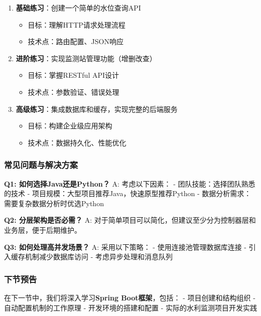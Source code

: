 \begin{enumerate}
\def\labelenumi{\arabic{enumi}.}
\tightlist
\item
  \textbf{基础练习}：创建一个简单的水位查询API

  \begin{itemize}
  \tightlist
  \item
    目标：理解HTTP请求处理流程
  \item
    技术点：路由配置、JSON响应
  \end{itemize}
\item
  \textbf{进阶练习}：实现监测站管理功能（增删改查）

  \begin{itemize}
  \tightlist
  \item
    目标：掌握RESTful API设计
  \item
    技术点：参数验证、错误处理
  \end{itemize}
\item
  \textbf{高级练习}：集成数据库和缓存，实现完整的后端服务

  \begin{itemize}
  \tightlist
  \item
    目标：构建企业级应用架构
  \item
    技术点：数据持久化、性能优化
  \end{itemize}
\end{enumerate}

\subsubsection{常见问题与解决方案}\label{ux5e38ux89c1ux95eeux9898ux4e0eux89e3ux51b3ux65b9ux6848}

\textbf{Q1: 如何选择Java还是Python？} A: 考虑以下因素： - 团队技能：选择团队熟悉的技术 - 项目规模：大型项目推荐Java，快速原型推荐Python - 数据分析需求：需要复杂数据分析时优选Python

\textbf{Q2: 分层架构是否必需？} A: 对于简单项目可以简化，但建议至少分为控制器层和业务层，便于后期维护。

\textbf{Q3: 如何处理高并发场景？} A: 采用以下策略： - 使用连接池管理数据库连接 - 引入缓存机制减少数据库访问 - 考虑异步处理和消息队列

\subsubsection{下节预告}\label{ux4e0bux8282ux9884ux544a}

在下一节中，我们将深入学习\textbf{Spring Boot框架}，包括： - 项目创建和结构组织 - 自动配置机制的工作原理 - 开发环境的搭建和配置 - 实际的水利监测项目开发实践

